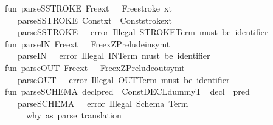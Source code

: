 \begin{isabellebody}
fun\ parse{\isacharunderscore}SSTROKE\ {\isacharbrackleft}Free{\isacharparenleft}x{\isacharcomma}t{\isacharparenright}{\isacharbrackright}\ {\isacharequal}\ \ Free{\isacharparenleft}stroke\ {\isacharparenleft}x{\isacharcomma}t{\isacharparenright}{\isacharparenright}\isanewline
\ \ \ {\isacharbar}parse{\isacharunderscore}SSTROKE\ {\isacharbrackleft}Const{\isacharparenleft}x{\isacharcomma}t{\isacharparenright}{\isacharbrackright}{\isacharequal}\ \ Const{\isacharparenleft}stroke{\isacharparenleft}x{\isacharcomma}t{\isacharparenright}{\isacharparenright}\isanewline
\ \ \ {\isacharbar}parse{\isacharunderscore}SSTROKE\ {\isacharunderscore}\ {\isacharequal}\ error\ {\isacharparenleft}{\isachardoublequote}Illegal\ STROKE{\isacharminus}Term{\isacharcolon}\ must\ be\ identifier{\isachardot}{\isachardoublequote}{\isacharparenright}{\isacharsemicolon}\isanewline
\isanewline
fun\ parse{\isacharunderscore}IN\ {\isacharbrackleft}Free{\isacharparenleft}x{\isacharcomma}t{\isacharparenright}{\isacharbrackright}\ {\isacharequal}\ \ Free{\isacharparenleft}x{\isacharcircum}ZPrelude{\isachardot}in{\isacharunderscore}sym{\isacharcomma}t{\isacharparenright}\isanewline
\ \ \ {\isacharbar}parse{\isacharunderscore}IN\ {\isacharunderscore}\ {\isacharequal}\ error\ {\isacharparenleft}{\isachardoublequote}Illegal\ IN{\isacharminus}Term{\isacharcolon}\ must\ be\ identifier{\isachardot}{\isachardoublequote}{\isacharparenright}{\isacharsemicolon}\isanewline
\isanewline
fun\ parse{\isacharunderscore}OUT\ {\isacharbrackleft}Free{\isacharparenleft}x{\isacharcomma}t{\isacharparenright}{\isacharbrackright}\ {\isacharequal}\ \ Free{\isacharparenleft}x{\isacharcircum}ZPrelude{\isachardot}out{\isacharunderscore}sym{\isacharcomma}t{\isacharparenright}\isanewline
\ \ \ {\isacharbar}parse{\isacharunderscore}OUT\ {\isacharunderscore}\ {\isacharequal}\ error\ {\isacharparenleft}{\isachardoublequote}Illegal\ OUT{\isacharminus}Term{\isacharcolon}\ must\ be\ identifier{\isachardot}{\isachardoublequote}{\isacharparenright}{\isacharsemicolon}\isanewline
\isanewline
fun\ parse{\isacharunderscore}SCHEMA\ {\isacharbrackleft}decl{\isacharcomma}pred{\isacharbrackright}\ {\isacharequal}\ Const{\isacharparenleft}{\isachardoublequote}DECL{\isachardoublequote}{\isacharcomma}dummyT{\isacharparenright}\ {\isachardollar}\ decl\ {\isachardollar}\ pred\isanewline
\ \ \ {\isacharbar}parse{\isacharunderscore}SCHEMA\ {\isacharunderscore}\ {\isacharequal}\ error\ {\isacharparenleft}{\isachardoublequote}Illegal\ Schema\ Term{\isachardot}{\isachardoublequote}{\isacharparenright}{\isacharsemicolon}\isanewline
\ \ \ \ {\isacharparenleft}{\isacharasterisk}\ why\ as\ parse\ translation\ {\isacharquery}{\isacharquery}{\isacharquery}\ {\isacharasterisk}{\isacharparenright}\isanewline

\end{isabellebody}
